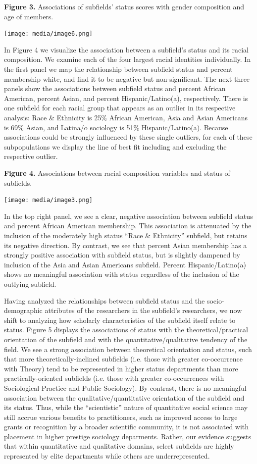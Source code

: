 \documentclass{article}
\begin{document}
\textbf{Figure 3.} Associations of subfields' status scores with gender
composition and age of members.

\texttt{[image: media/image6.png]}

In Figure 4 we visualize the association between a subfield's status and
its racial composition. We examine each of the four largest racial
identities individually. In the first panel we map the relationship
between subfield status and percent membership white, and find it to be
negative but non-significant. The next three panels show the
associations between subfield status and percent African American,
percent Asian, and percent Hispanic/Latino(a), respectively. There is
one subfield for each racial group that appears as an outlier in its
respective analysis: Race \& Ethnicity is 25\% African American, Asia
and Asian Americans is 69\% Asian, and Latina/o sociology is 51\%
Hispanic/Latino(a). Because associations could be strongly influenced by
these single outliers, for each of these subpopulations we display the
line of best fit including and excluding the respective outlier.

\textbf{Figure 4.} Associations between racial composition variables and
status of subfields.

\texttt{[image: media/image3.png]}

In the top right panel, we see a clear, negative association between
subfield status and percent African American membership. This
association is attenuated by the inclusion of the moderately high status
``Race \& Ethnicity'' subfield, but retains its negative direction. By
contrast, we see that percent Asian membership has a strongly positive
association with subfield status, but is slightly dampened by inclusion
of the Asia and Asian Americans subfield. Percent Hispanic/Latino(a)
shows no meaningful association with status regardless of the inclusion
of the outlying subfield.

Having analyzed the relationships between subfield status and the
socio-demographic attributes of the researchers in the subfield's
researchers, we now shift to analyzing how scholarly characteristics of
the subfield itself relate to status. Figure 5 displays the associations
of status with the theoretical/practical orientation of the subfield and
with the quantitative/qualitative tendency of the field. We see a strong
association between theoretical orientation and status, such that more
theoretically-inclined subfields (i.e. those with greater co-occurrence
with Theory) tend to be represented in higher status departments than
more practically-oriented subfields (i.e. those with greater
co-occurrences with Sociological Practice and Public Sociology). By
contrast, there is no meaningful association between the
qualitative/quantitative orientation of the subfield and its status.
Thus, while the ``scientistic'' nature of quantitative social science
may still accrue various benefits to practitioners, such as improved
access to large grants or recognition by a broader scientific community,
it is not associated with placement in higher prestige sociology
deparments. Rather, our evidence suggests that within quantitative and
qualitative domains, select subfields are highly represented by elite
departments while others are underrepresented.
\end{document}
